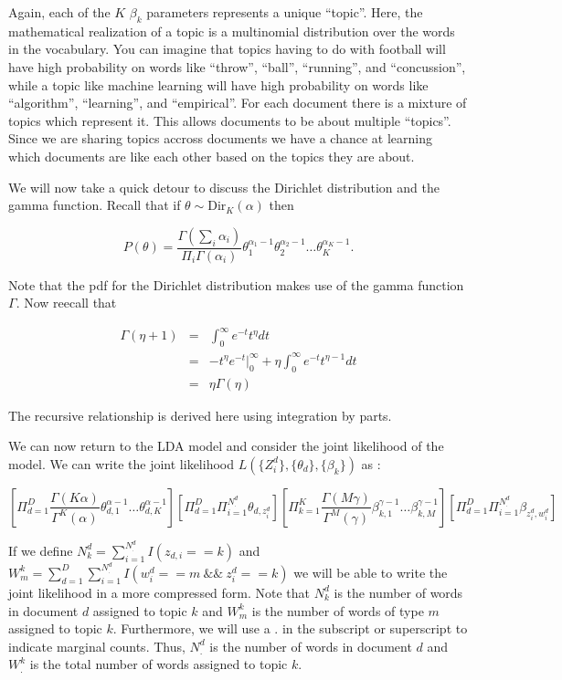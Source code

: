 \documentclass[11pt]{amsart}
\begin{document}
Again, each of the $K$ $\beta_k$ parameters represents a unique ``topic''.  Here, the mathematical realization of a topic is a multinomial distribution over the words in the vocabulary.  You can imagine that topics having to do with football will have high probability on words like ``throw'', ``ball'', ``running'', and ``concussion'', while a topic like machine learning will have high probability on words like ``algorithm'', ``learning'', and ``empirical''.  For each document there is a mixture of topics which represent it.  This allows documents to be about multiple ``topics''.  Since we are sharing topics accross documents we have a chance at learning which documents are like each other based on the topics they are about.

We will now take a quick detour to discuss the Dirichlet distribution and the gamma function.  Recall that if $\theta \sim \textrm{Dir}_K(\alpha)$ then

 $$P(\theta) = \frac{\Gamma(\sum_i \alpha_i)}{\Pi_i \Gamma(\alpha_i)} \theta_1^{\alpha_1 - 1} \theta_2^{\alpha_2 - 1} \ldots \theta_K^{\alpha_K -1}.$$

\noindent Note that the pdf for the Dirichlet distribution makes use of the gamma function $\Gamma$. Now reecall that

\begin{eqnarray*}
  \Gamma(\eta + 1) &=& \int_0^\infty e^{-t}t^\eta dt\\
  &=& -t^\eta e^{-t} |_0^\infty + \eta \int_0^\infty e^{-t}t^{\eta - 1}dt\\
  &=& \eta \Gamma(\eta)
\end{eqnarray*}

\noindent  The recursive relationship is derived here using integration by parts. 

We can now return to the LDA model and consider the joint likelihood of the model.  We can write the joint likelihood $L(\{Z_i^d\}, \{\theta_d\}, \{\beta_k\})$ as :

$$\left[ \Pi_{d = 1}^D \frac{\Gamma(K\alpha)}{\Gamma^K(\alpha)} \theta_{d,1}^{\alpha - 1} \ldots \theta_{d,K}^{\alpha - 1} \right] \left[ \Pi_{d = 1}^D \Pi_{i = 1}^{N^d_.} \theta_{d,z^d_i}  \right] \left[ \Pi_{k = 1}^K \frac{\Gamma(M\gamma)}{\Gamma^M(\gamma)} \beta_{k,1}^{\gamma -1} \ldots \beta_{k,M}^{\gamma - 1} \right] \left[ \Pi_{d = 1}^D \Pi_{i = 1}^{N^d_.} \beta_{z^d_i,w^d_i} \right] $$

\noindent  If we define $N^d_k = \sum_{i = 1}^{N^d_.}I(z_{d,i} == k)$ and  $W_m^k = \sum_{d = 1}^D \sum_{i = 1}^{N^d_.} I(w^d_i == m \  \&\& \  z^d_i == k)$ we will be able to write the joint likelihood in a more compressed form.  Note that $N^d_k$ is the number of words in document $d$ assigned to topic $k$ and $W_m^k$ is the number of words of type $m$ assigned to topic $k$.  Furthermore, we will use a $.$ in the subscript or superscript to indicate marginal counts. Thus, $N_.^d$ is the number of words in document $d$ and $W_.^k$ is the total number of words assigned to topic $k$.
\end{document}

